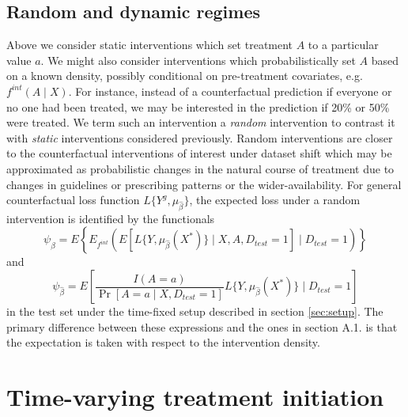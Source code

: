     \subsection{Random and dynamic regimes}\label{sec:randomdynamic}
    Above we consider static interventions which set treatment $A$ to a particular value $a$. We might also consider interventions which probabilistically set $A$ based on a known density, possibly conditional on pre-treatment covariates, e.g. $f^{int}(A \mid X)$. For instance, instead of a counterfactual prediction if everyone or no one had been treated, we may be interested in the prediction if 20\% or 50\% were treated. We term such an intervention a \textit{random} intervention to contrast it with \textit{static} interventions considered previously. Random interventions are closer to the counterfactual interventions of interest under dataset shift which may be approximated as probabilistic changes in the natural course of treatment due to changes in guidelines or prescribing patterns or the wider-availability. For general counterfactual loss function $L\{Y^{g}, \mu_{\widehat{\beta}}\}$, the expected loss under a random intervention is identified by the functionals
    \begin{equation}\label{eqn:rand_cl_estimand}
        \psi_{\widehat{\beta}} = E\left\{E_{f^{int}}\left(E[L\{Y, \mu_{\widehat{\beta}}(X^*)\} \mid X, A, D_{test} = 1] \mid D_{test} = 1\right)\right\}
    \end{equation}
    and 
    \begin{equation}\label{eqn:rand_ipw_estimand}
        \psi_{\widehat{\beta}} = E\left[\frac{I(A = a)}{\Pr[A = a \mid X, D_{test} = 1]}L\{Y, \mu_{\widehat{\beta}}(X^*)\} \mid D_{test} = 1\right]
    \end{equation}
    in the test set under the time-fixed setup described in section \ref{sec:setup}. The primary difference between these expressions and the ones in section A.1. is that the expectation is taken with respect to the intervention density. 


\section{Time-varying treatment initiation}\label{sec:timevarying}
